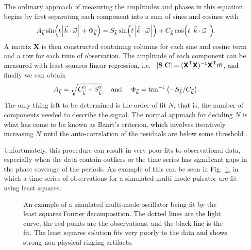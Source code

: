 \documentclass[11pt,twoside]{book}
\begin{document}
The ordinary approach of measuring the amplitudes and phases in this equation begins by first separating each component into a sum of sines and cosines with
\begin{equation} \label{eq:varsep}
    A_{\vec k} \sin(t\qty[\vec k\cdot \vec \omega] + \Phi_{\vec k}) = S_{\vec k} \sin(t\qty[\vec k\cdot \vec \omega]) + C_{\vec k} \cos(t\qty[\vec k\cdot \vec \omega]).
\end{equation}
A matrix $\mathbf{X}$ is then constructed containing columns for each sine and cosine term and a row for each time of observation. The amplitude of each component can be measured with least squares linear regression, i.e.~ $\qty[\mathbf{S}\; \mathbf{C}] = (\textsf{\textbf{X}}^\text{T} \textsf{\textbf{X}})^{-1} \textsf{\textbf{X}}^\text{T} \vec{m}$, and finally we can obtain
\begin{equation}
    A_{\vec{k}} = \sqrt{C_{\vec{k}}^2 + S_{\vec{k}}^2} \quad \text{ and } \quad \Phi_{\vec{k}} = \tan^{-1} \qty(-S_{\vec{k}} / C_{\vec{k}}).
\end{equation}
The only thing left to be determined is the order of fit $N$, that is, the number of components needed to describe the signal. The normal approach for deciding $N$ is what has come to be known as Baart's criterion, which involves iteratively increasing $N$ until the auto-correlation of the residuals are below some threshold \citep{baart1982use, petersen1986studies}. 

Unfortunately, this procedure can result in very poor fits to observational data, especially when the data contain outliers or the time series has significant gaps in the phase coverage of the periods. An example of this can be seen in Fig.~\ref{fig:badfit}, in which a time series of observations for a simulated multi-mode pulsator are fit using least squares. 

\begin{figure}
    \centering
    
    \caption{An example of a simulated multi-mode oscillator being fit by the least squares Fourier decomposition. The dotted lines are the light curve, the red points are the observations, and the black line is the fit. The least squares solution fits very poorly to the data and shows strong non-physical ringing artifacts.} 
    \label{fig:badfit} 
\end{figure} 
\end{document}
